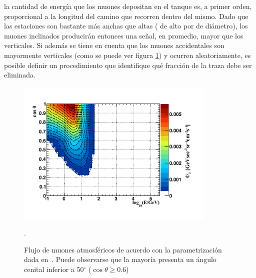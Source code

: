 		 la cantidad de energía que los muones depositan en el tanque es, a primer orden, proporcional a la longitud del camino que recorren dentro del mismo.
		Dado que las estaciones son bastante más anchas que altas ( de alto por  de diámetro), los muones inclinados producir\'an entonces una señal, en promedio, mayor que los verticales.
		Si adem\'as se tiene en cuenta que los muones accidentales son mayormente verticales (como se puede ver figura \ref{fig:atmo_mu_flux}) y ocurren aleatoriamente, es posible definir un procedimiento que identifique qué fracción de la traza debe ser eliminada.
		\begin{figure}[ht]
		\begin{center}
		\includegraphics[width=0.85\textwidth]{fig/seleccionAuger/atmo_mu_flux.pdf}
		\caption{Flujo de muones atmosféricos de acuerdo con la parametrización dada en~\cite{cite:atmo_mu}. Puede observarse que la mayoría presenta un ángulo cenital inferior a 50$^{\circ}$ ($\cos\theta \geqslant 0.6$)}.
		\label{fig:atmo_mu_flux}
		\end{center}
		\end{figure}
		
